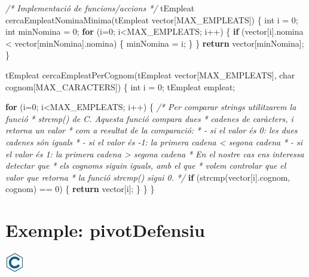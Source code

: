 \documentclass[
]{book}
\newenvironment{Shaded}{\begin{snugshade}}{\end{snugshade}}
\newcommand{\CommentTok}[1]{\textcolor[rgb]{0.56,0.35,0.01}{\textit{#1}}}
\newcommand{\ControlFlowTok}[1]{\textcolor[rgb]{0.13,0.29,0.53}{\textbf{#1}}}
\newcommand{\DataTypeTok}[1]{\textcolor[rgb]{0.13,0.29,0.53}{#1}}
\newcommand{\DecValTok}[1]{\textcolor[rgb]{0.00,0.00,0.81}{#1}}
\newcommand{\NormalTok}[1]{#1}
\begin{document}
\begin{Shaded}
\begin{Highlighting}[]
\CommentTok{/* Implementació de funcions/accions */}
\NormalTok{tEmpleat cercaEmpleatNominaMinima(tEmpleat vector[MAX\_EMPLEATS]) \{}
    \DataTypeTok{int}\NormalTok{ i = }\DecValTok{0}\NormalTok{; }
    \DataTypeTok{int}\NormalTok{ minNomina = }\DecValTok{0}\NormalTok{;}
    \ControlFlowTok{for}\NormalTok{ (i=}\DecValTok{0}\NormalTok{; i\textless{}MAX\_EMPLEATS; i++) \{}
        \ControlFlowTok{if}\NormalTok{ (vector[i].nomina \textless{} vector[minNomina].nomina) \{}
\NormalTok{            minNomina = i;}
\NormalTok{        \}}
\NormalTok{    \}}
    \ControlFlowTok{return}\NormalTok{ vector[minNomina];}
\NormalTok{\}}

\NormalTok{tEmpleat cercaEmpleatPerCognom(tEmpleat vector[MAX\_EMPLEATS], }\DataTypeTok{char}\NormalTok{ cognom[MAX\_CARACTERS]) \{}
    \DataTypeTok{int}\NormalTok{ i = }\DecValTok{0}\NormalTok{; }
\NormalTok{    tEmpleat empleat;}

    \ControlFlowTok{for}\NormalTok{ (i=}\DecValTok{0}\NormalTok{; i\textless{}MAX\_EMPLEATS; i++) \{}
        \CommentTok{/* Per comparar strings utilitzarem la funció}
\CommentTok{         *  strcmp() de C. Aquesta funció compara dues}
\CommentTok{         *  cadenes de caràcters, i retorna un valor}
\CommentTok{         *  com a resultat de la comparació:}
\CommentTok{         *  {-} si el valor és 0: les dues cadenes són iguals}
\CommentTok{         *  {-} si el valor és {-}1: la primera cadena \textless{} segona cadena}
\CommentTok{         *  {-} si el valor és 1: la primera cadena \textgreater{} segona cadena}
\CommentTok{         *  En el nostre cas ens interessa detectar que}
\CommentTok{         *  els cognoms siguin iguals, amb el que }
\CommentTok{         *  volem controlar que el valor que retorna}
\CommentTok{         *  la funció strcmp() sigui 0. }
\CommentTok{         */}
        \ControlFlowTok{if}\NormalTok{ (strcmp(vector[i].cognom, cognom) == }\DecValTok{0}\NormalTok{) \{}
            \ControlFlowTok{return}\NormalTok{ vector[i];}
\NormalTok{        \}}
\NormalTok{    \}}
\NormalTok{\}}
\end{Highlighting}
\end{Shaded}

\hypertarget{exemple-pivotdefensiu}{%
\section{Exemple: pivotDefensiu}\label{exemple-pivotdefensiu}}

\includegraphics{./img/c.png}
\end{document}
